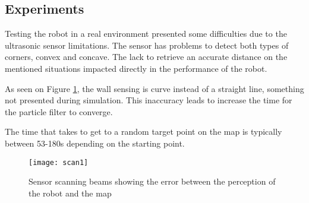 \subsection{Experiments}

Testing the robot in a real environment presented some difficulties due to the  ultrasonic sensor limitations. The sensor has problems to detect both types of corners, convex and concave. The lack to retrieve an accurate distance on the mentioned situations impacted directly in the performance of the robot.

As seen on Figure \ref{fig:scan1}, the wall sensing is curve instead of a straight line, something not presented during simulation. This inaccuracy leads to increase the time for the particle filter to converge.
	
The time that takes to get to a random target point on the map is typically between 53-180s depending on the starting point. 
	
		\begin{figure}[h]
			\centering
			\texttt{[image: scan1]}
			\caption{Sensor scanning beams showing the error between the perception of the robot and the map}
			\label{fig:scan1}
		\end{figure}
		